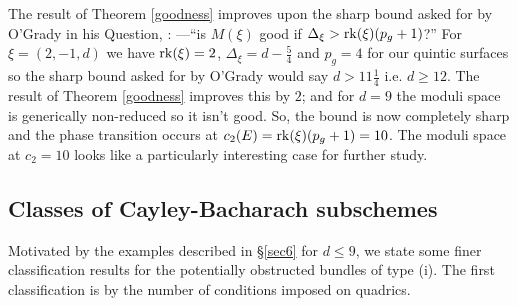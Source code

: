 \documentclass{amsart}
\theoremstyle{plain}
\numberwithin{equation}{section}
\begin{document}
The result of Theorem \ref{goodness} improves upon the sharp bound asked for by O'Grady
in his Question, \cite[p. 112]{OGradyQuest}:
\newline
---``is $M(\xi )$ good if $\Delta _{\xi}> {{\rm rk}} (\xi )(p_g+1)$?''
\newline
For $\xi = (2,-1,d)$ we  have ${{\rm rk}} (\xi )=2$, $\Delta _{\xi}= d-\frac{5}{4}$
and $p_g=4$ for our
quintic surfaces
so the sharp bound asked for by O'Grady would say $d> 11 \frac{1}{4}$ i.e. $d\geq 12$. 
The result of Theorem \ref{goodness} improves this by $2$; and for $d=9$ the
moduli space is generically non-reduced so it isn't good. 
So, the bound is now completely sharp and the phase transition occurs at $c_2(E)= {{\rm rk}} (\xi )(p_g+1)=10$. The moduli space at $c_2=10$ looks like a particularly interesting case
for further study. 

\subsection{Classes of Cayley-Bacharach subschemes}

Motivated by the examples described in \S \ref{sec6} for $d\leq 9$, we state some finer classification results for the
potentially obstructed bundles of type (i). The first classification is by the number of
conditions imposed on quadrics. 
\end{document}
